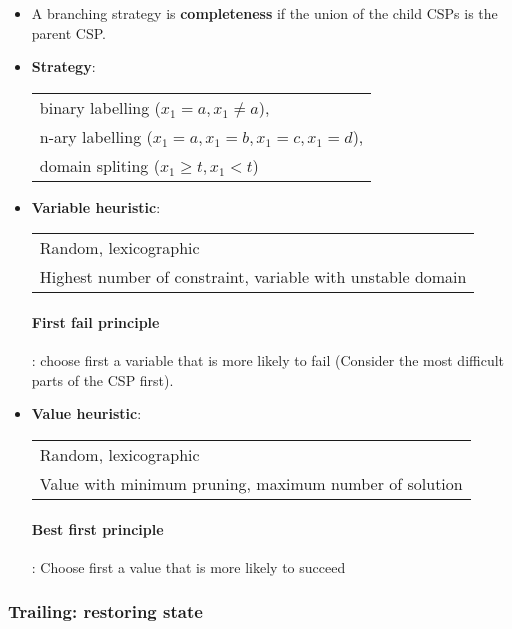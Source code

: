 \begin{itemize}
    \item A branching strategy is \textbf{completeness}
        if the union of the child CSPs is the parent CSP.

    \item \textbf{Strategy}: 
        \begin{tabular}{l}
            binary labelling ($x_1=a, x_1 \neq a$),\\
            n-ary labelling ($x_1=a, x_1=b, x_1=c, x_1=d$),\\
            domain spliting ($x_1\geq t, x_1 < t$)
        \end{tabular}

    \item \textbf{Variable heuristic}: 
        \begin{tabular}{l}
            Random, lexicographic \\
            Highest number of constraint, variable with unstable
            domain
        \end{tabular}

        \paragraph{First fail principle}: choose first a variable that
        is more likely to fail (Consider the most difficult parts of the
        CSP first).

    \item \textbf{Value heuristic}:
        \begin{tabular}{l}
            Random, lexicographic\\
            Value with minimum pruning, maximum number of solution\\
        \end{tabular}

        \paragraph{Best first principle}: Choose first a value that is
        more likely to succeed
\end{itemize}

\subsubsection{Trailing: restoring state}

